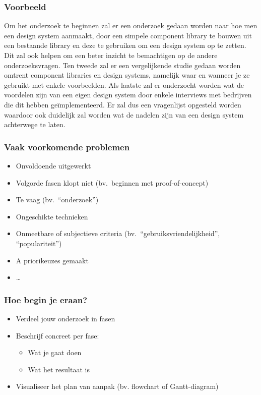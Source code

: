 \documentclass[aspectratio=169]{beamer}
\begin{document}
\begin{frame}
  \frametitle{Voorbeeld}

  \small

  Om het onderzoek te beginnen zal er een onderzoek gedaan worden naar hoe men een design system aanmaakt, door een simpele component library te bouwen uit een bestaande library en deze te gebruiken om een design system op te zetten. Dit zal ook helpen om een beter inzicht te bemachtigen op de andere onderzoeksvragen. Ten tweede zal er een vergelijkende studie gedaan worden omtrent component libraries en design systems, namelijk waar en wanneer je ze gebruikt met enkele voorbeelden. Als laatste zal er onderzocht worden wat de voordelen zijn van een eigen design system door enkele interviews met bedrijven die dit hebben geïmplementeerd. Er zal dus een vragenlijst opgesteld worden waardoor ook duidelijk zal worden wat de nadelen zijn van een design system achterwege te laten.

\end{frame}

\begin{frame}
  \frametitle{Vaak voorkomende problemen}

  \begin{itemize}
    \item Onvoldoende uitgewerkt
    \item Volgorde fasen klopt niet (bv.\ beginnen met proof-of-concept)
    \item Te vaag (bv.\ ``onderzoek'')
    \item Ongeschikte technieken
    \item Onmeetbare of subjectieve criteria (bv.\ ``gebruiksvriendelijkheid'', ``populariteit'')
    \item A priorikeuzes gemaakt
    \item \ldots
  \end{itemize}

\end{frame}

\begin{frame}
  \frametitle{Hoe begin je eraan?}

  \begin{itemize}
    \item Verdeel jouw onderzoek in fasen
    \item Beschrijf concreet per fase:
          \begin{itemize}
            \item Wat je gaat doen
            \item Wat het resultaat is
          \end{itemize}
    \item Visualiseer het plan van aanpak (bv. flowchart of Gantt-diagram)
  \end{itemize}
\end{frame}
\end{document}
